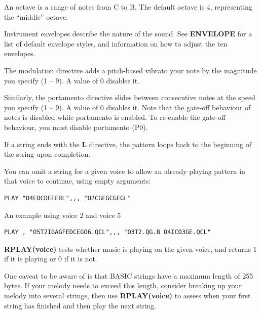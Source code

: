 \begin{description}[leftmargin=2cm,style=nextline]
                  An octave is a range of notes from C to B. The default octave is 4, representing the ``middle'' octave.

                  Instrument envelopes describe the nature of the sound. See {\bf ENVELOPE} for a list of default envelope styles, and information on how to adjust the ten envelopes.

                  The modulation directive adds a pitch-based vibrato your note by the magnitude you specify (1 -- 9). A value of 0 disables it.

                  Similarly, the portamento directive slides between consecutive notes at the speed you specify (1 -- 9). A value of 0 disables it. Note that the gate-off behaviour of notes is disabled while portamento is enabled. To re-enable the gate-off behaviour, you must disable portamento (P0).

                  If a string ends with the {\bf L} directive, the pattern loops back to the beginning of the string upon completion.

                  You can omit a string for a given voice to allow an already playing pattern in that voice to continue, using empty arguments:

\begin{tcolorbox}[colback=black,coltext=white]
\verbatimfont{\codefont}
\begin{verbatim}
PLAY "O4EDCDEEERL",,, "O2CGEGCGEGL"
\end{verbatim}
\end{tcolorbox}

                  An example using voice 2 and voice 5

\begin{tcolorbox}[colback=black,coltext=white]
\verbatimfont{\codefont}
\begin{verbatim}
PLAY , "O5T2IGAGFEDCEGO6.QCL",,, "O3T2.QG.B O4ICO3GE.QCL"
\end{verbatim}
\end{tcolorbox}

                  {\bf RPLAY(voice)} tests whether music is playing on the given voice, and returns 1 if it is playing or 0 if it is not.

                  One caveat to be aware of is that BASIC strings have a maximum length of 255 bytes. If your melody needs to exceed this length, consider breaking up your melody into several strings, then use {\bf RPLAY(voice)} to assess when your first string has finished and then play the next string.


\end{description}
